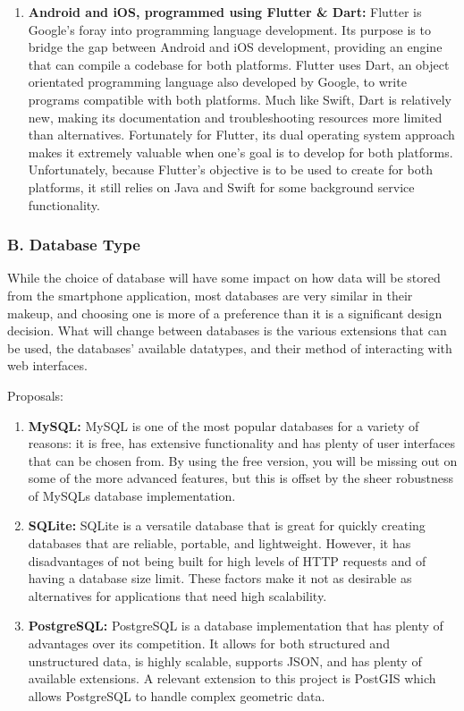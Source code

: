 \begin{enumerate}
    \item \textbf{Android and iOS, programmed using Flutter \& Dart:} Flutter is Google's foray into programming language development. Its purpose is to bridge the gap between Android and iOS development, providing an engine that can compile a codebase for both platforms. Flutter uses Dart, an object orientated programming language also developed by Google, to write programs compatible with both platforms. Much like Swift, Dart is relatively new, making its documentation and troubleshooting resources more limited than alternatives. Fortunately for Flutter, its dual operating system approach makes it extremely valuable when one's goal is to develop for both platforms. Unfortunately, because Flutter's objective is to be used to create for both platforms, it still relies on Java and Swift for some background service functionality.
\end{enumerate}

\subsubsection{B. Database Type}

While the choice of database will have some impact on how data will be stored from the smartphone application, most databases are very similar in their makeup, and choosing one is more of a preference than it is a significant design decision. What will change between databases is the various extensions that can be used, the databases' available datatypes, and their method of interacting with web interfaces.

Proposals:

\begin{enumerate}
    \item \textbf{MySQL:} MySQL is one of the most popular databases for a variety of reasons: it is free, has extensive functionality and has plenty of user interfaces that can be chosen from. By using the free version, you will be missing out on some of the more advanced features, but this is offset by the sheer robustness of MySQLs database implementation.
    \item \textbf{SQLite:} SQLite is a versatile database that is great for quickly creating databases that are reliable, portable, and lightweight. However, it has disadvantages of not being built for high levels of HTTP requests and of having a database size limit. These factors make it not as desirable as alternatives for applications that need high scalability.
    \item \textbf{PostgreSQL:} PostgreSQL is a database implementation that has plenty of advantages over its competition. It allows for both structured and unstructured data, is highly scalable, supports JSON, and has plenty of available extensions. A relevant extension to this project is PostGIS which allows PostgreSQL to handle complex geometric data.
\end{enumerate}

